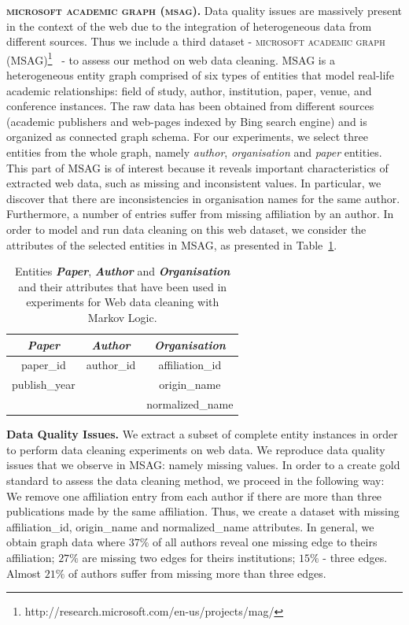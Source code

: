 \textbf{\textsc{microsoft academic graph (msag)}.} Data quality issues are massively present in the context of the web due to the integration of heterogeneous data from different sources. Thus we include a third dataset - \textsc{microsoft academic graph (MSAG)}\footnote{http://research.microsoft.com/en-us/projects/mag/}~\cite{msag2015} - to assess our method on web data cleaning. MSAG is a heterogeneous entity graph comprised of six types of entities that model real-life academic relationships: field of study, author, institution, paper, venue, and conference instances. The raw data has been obtained from different sources (academic publishers and web-pages indexed by Bing search engine) and is organized as connected graph schema. For our experiments, we select three entities from the whole graph, namely \textit{author}, \textit{organisation} and \textit{paper} entities. This part of \textsc{MSAG} is of interest because it reveals important characteristics of extracted web data, such as missing and inconsistent values. In particular, we discover that there are inconsistencies in organisation names for the same author. Furthermore, a number of entries suffer from missing affiliation by an author. In order to model and run data cleaning on this web dataset, we consider the attributes of the selected entities in \textsc{MSAG}, as presented in Table~\ref{tab:msagattrs}. 
\begin{table}[t]\footnotesize
\centering
\begin{tabular}{ccc}
\textbf{\textit{Paper}}         & \textbf{\textit{Author}}     & \textbf{\textit{Organisation}}      \\ \hline
\textsf{paper\_id}     & \textsf{author\_id} & \textsf{affiliation\_id}  \\
\textsf{publish\_year} &            & \textsf{origin\_name}     \\
              &            & \textsf{normalized\_name}\\ \hline
\end{tabular}
\caption{Entities \textbf{\textit{Paper}}, \textbf{\textit{Author}} and \textbf{\textit{Organisation}} and their attributes that have been used in experiments for Web data cleaning with Markov Logic.}
    \label{tab:msagattrs}
\end{table}

\textbf{Data Quality Issues.} We extract a subset of complete entity instances in order to perform data cleaning experiments on web data. We reproduce data quality issues that we observe in \textsc{MSAG}: namely missing values. In order to a create gold standard to assess the data cleaning method, we proceed in the following way: We remove one affiliation entry from each author if there are more than three publications made by the same affiliation. Thus, we create a dataset with missing \textsf{affiliation\_id}, \textsf{origin\_name} and \textsf{normalized\_name} attributes. In general, we obtain graph data where $37\%$ of all authors reveal one missing edge to theirs affiliation; $27\%$ are missing two edges for theirs institutions; $15\%$ - three edges. Almost $21\%$ of authors suffer from missing more than three edges. 

